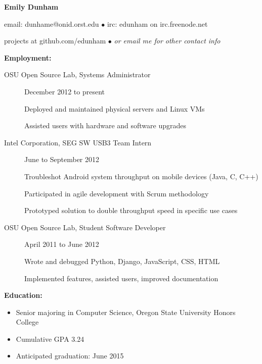 \documentclass[11pt]{article}
\begin{document}
\centerline{{\LARGE \bf Emily Dunham}}

\bigskip

\centerline{email: dunhame@onid.orst.edu
        $\bullet$
        irc: edunham on irc.freenode.net}
\centerline{projects at github.com/edunham
        $\bullet$
        \emph{or email me for other contact info}}

\bigskip
\hrulefill
\bigskip

{\Large \bf Employment:}
\begin{description}
\item[OSU Open Source Lab, Systems Administrator]
    \hfill December 2012 to present

    Deployed and maintained physical servers and Linux VMs

    Assisted users with hardware and software upgrades

\item[Intel Corporation, SEG SW USB3 Team Intern]
    \hfill June to September 2012

    Troubleshot Android system throughput on mobile devices (Java, C, C++)

    Participated in agile development with Scrum methodology

    Prototyped solution to double throughput speed in specific use cases

\item[OSU Open Source Lab, Student Software Developer]
    \hfill April 2011 to June 2012

    Wrote and debugged Python, Django, JavaScript, CSS, HTML

    Implemented features, assisted users, improved documentation
\end{description}

\smallskip
\hrulefill
\bigskip

{\Large \bf Education:}
\begin{itemize}
    \setlength{\itemsep}{1pt}
    \setlength{\parskip}{0pt}
    \setlength{\parsep}{0pt}

    \item Senior majoring in Computer Science, Oregon State University
          Honors College
    \item Cumulative GPA 3.24
    \item Anticipated graduation: June 2015

\end{itemize}

\smallskip
\hrulefill
\bigskip
\end{document}
